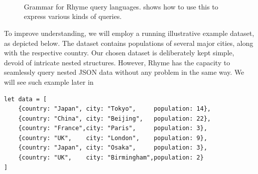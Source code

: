 \documentclass[runningheads]{llncs}
\newcommand{\lang}{Rhyme}
\begin{document}
\begin{figure}[t!]
\scriptsize
\begin{bnf*}
\\
 \\
 \\
 \\
 \\
 \\
 \\
 \\
\end{bnf*}
\caption{Grammar for \lang{} query languages.  shows how to use this to express
various kinds of queries.}\label{fig:grammar}
\end{figure}



To improve understanding, we will employ a running illustrative example dataset, as
depicted below.
The dataset contains populations of several major cities,
along with the respective country.
Our chosen dataset is deliberately kept simple, devoid of
intricate nested structures.
However, \lang{} has the capacity to seamlessly query
nested JSON data without any problem in the same way.
We will see such example later in 

\begin{lstlisting}[style=JavaScript]
let data = [
    {country: "Japan", city: "Tokyo",     population: 14},
    {country: "China", city: "Beijing",   population: 22},
    {country: "France",city: "Paris",     population: 3},
    {country: "UK",    city: "London",    population: 9},
    {country: "Japan", city: "Osaka",     population: 3},
    {country: "UK",    city: "Birmingham",population: 2}
]
\end{lstlisting}
\end{document}
